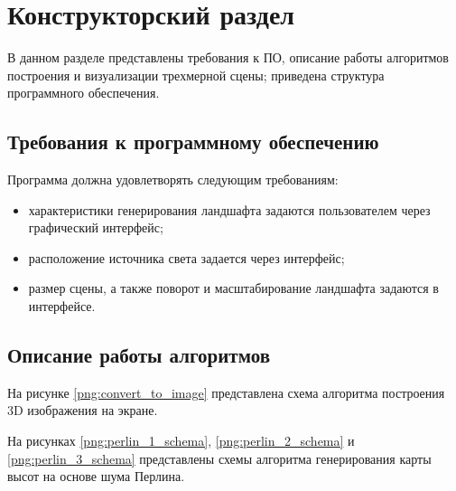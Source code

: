 \chapter{Конструкторский раздел}

В данном разделе представлены требования к ПО, описание работы алгоритмов построения и визуализации трехмерной сцены; приведена структура программного обеспечения.

\section{Требования к программному обеспечению}
Программа должна удовлетворять следующим требованиям:
\begin{itemize}
	\item характеристики генерирования ландшафта задаются пользователем через графический интерфейс;
	\item расположение источника света задается через интерфейс;
	\item размер сцены, а также поворот и масштабирование ландшафта задаются в интерфейсе.
\end{itemize}

\section{Описание работы алгоритмов}
На рисунке \ref{png:convert_to_image} представлена схема алгоритма построения 3D изображения на экране.
\begin{figure}[H]
\end{figure}

\newpage
На рисунках \ref{png:perlin_1_schema}, \ref{png:perlin_2_schema}  и \ref{png:perlin_3_schema} представлены схемы алгоритма генерирования карты высот на основе шума Перлина.
\begin{figure}[H]
	\captionsetup{justification=centering}
\end{figure}

\begin{figure}[H]
	\captionsetup{justification=centering}
\end{figure}


